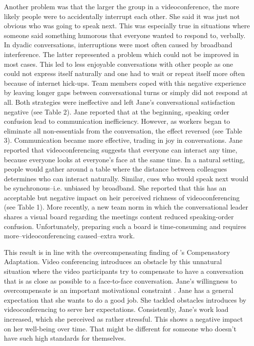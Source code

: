 \documentclass[man]{apa7}
\begin{document}
Another problem was that the larger the group in a videoconference, the more likely people were to accidentally interrupt each other. She said it was just not obvious who was going to speak next. This was especially true in situations where someone said something humorous that everyone wanted to respond to, verbally. In dyadic conversations, interruptions were most often caused by broadband interference. The latter represented a problem which could not be improved in most cases. This led to less enjoyable conversations with other people as one could not express itself naturally and one had to wait or repeat itself more often because of internet hick-ups. Team members coped with this negative experience by leaving longer gaps between conversational turns or simply did not respond at all. Both strategies were ineffective and left Jane's conversational satisfaction negative (see Table 2). Jane reported that at the beginning, speaking order confusion lead to communication inefficiency. However, as workers began to eliminate all non-essentials from the conversation, the effect reversed (see Table 3). Communication became more effective, trading in joy in conversations. Jane reported that videoconferencing suggests that everyone can interact any time, because everyone looks at everyone's face at the same time. In a natural setting, people would gather around a table where the distance between colleagues determines who can interact naturally. Similar, cues who would speak next would be synchronous–i.e. unbiased by broadband. She reported that this has an acceptable but negative impact on heir perceived richness of videoconferencing (see Table 1). More recently, a new team norm in which the conversational leader shares a visual board regarding the meetings content reduced speaking-order confusion. Unfortunately, preparing such a board is time-consuming and requires more–videoconferencing caused–extra work.

This result is in line with the overcompensating finding of \citeauthor{Kock2005}'s Compensatory Adaptation. Video conferencing introduces an obstacle by this unnatural situation where the video participants try to compensate to have a conversation that is as close as possible to a face-to-face conversation. Jane's willingness to overcompensate is an important motivational constraint \parencite{Kock2001}. Jane has a general expectation that she wants to do a good job. She tackled obstacles introduces by videoconferencing to serve her expectations. Consistently, Jane's work load increased, which she perceived as rather stressful. This shows a negative impact on her well-being over time. That might be different for someone who doesn't have such high standards for themselves.
\end{document}
